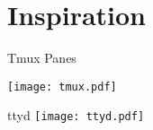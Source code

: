 \documentclass[compress]{beamer}
\begin{document}


\section{Inspiration}
\begin{frame}{Tmux Panes}

  \texttt{[image: tmux.pdf]}
\end{frame}
%
\begin{frame}{ttyd}
  \texttt{[image: ttyd.pdf]}
\end{frame}
\end{document}

